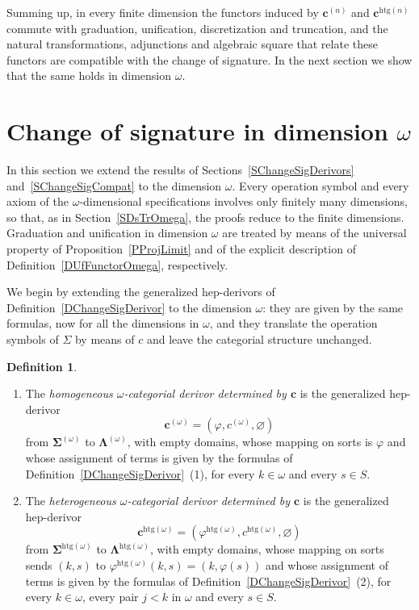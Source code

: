 \documentclass[a4paper, reqno]{amsbook}
\newcommand{\sig}[1]{\mathbf{#1}}             %
\newcommand{\htg}{\mathrm{htg}}                %
\theoremstyle{plain}
\theoremstyle{definition}
\newtheorem{definition}[theorem]{Definition}
\begin{document}
Summing up, in every finite dimension the functors induced by $\mathbf{c}^{(n)}$ and $\mathbf{c}^{\htg(n)}$ commute with graduation, unification, discretization and truncation, and the natural transformations, adjunctions and algebraic square that relate these functors are compatible with the change of signature.
In the next section we show that the same holds in dimension $\omega$.

\section{Change of signature in dimension \texorpdfstring{$\omega$}{omega}}\label{SChangeSigOmega}

In this section we extend the results of Sections~\ref{SChangeSigDerivors} and~\ref{SChangeSigCompat} to the dimension $\omega$.
Every operation symbol and every axiom of the $\omega$-dimensional specifications involves only finitely many dimensions, so that, as in Section~\ref{SDsTrOmega}, the proofs reduce to the finite dimensions.
Graduation and unification in dimension $\omega$ are treated by means of the universal property of Proposition~\ref{PProjLimit} and of the explicit description of Definition~\ref{DUfFunctorOmega}, respectively.

We begin by extending the generalized hep-derivors of Definition~\ref{DChangeSigDerivor} to the dimension $\omega$: they are given by the same formulas, now for all the dimensions in $\omega$, and they translate the operation symbols of $\Sigma$ by means of $c$ and leave the categorial structure unchanged.

\begin{definition}\label{DChangeSigDerivorOmega}
\begin{enumerate}
\item The \emph{homogeneous $\omega$-categorial derivor determined by $\mathbf{c}$} is the generalized hep-derivor
$$
\mathbf{c}^{(\omega)}=\left(\varphi,c^{(\omega)},\varnothing\right)
$$
from $\sig{\Sigma}^{(\omega)}$ to $\sig{\Lambda}^{(\omega)}$, with empty domains, whose mapping on sorts is $\varphi$ and whose assignment of terms is given by the formulas of Definition~\ref{DChangeSigDerivor}~(1), for every $k\in\omega$ and every $s\in S$.
\item The \emph{heterogeneous $\omega$-categorial derivor determined by $\mathbf{c}$} is the generalized hep-derivor
$$
\mathbf{c}^{\htg(\omega)}=\left(\varphi^{\htg(\omega)},c^{\htg(\omega)},\varnothing\right)
$$
from $\sig{\Sigma}^{\htg(\omega)}$ to $\sig{\Lambda}^{\htg(\omega)}$, with empty domains, whose mapping on sorts sends $(k,s)$ to $\varphi^{\htg(\omega)}(k,s)=(k,\varphi(s))$ and whose assignment of terms is given by the formulas of Definition~\ref{DChangeSigDerivor}~(2), for every $k\in\omega$, every pair $j<k$ in $\omega$ and every $s\in S$.
\end{enumerate}
\end{definition}
\end{document}
